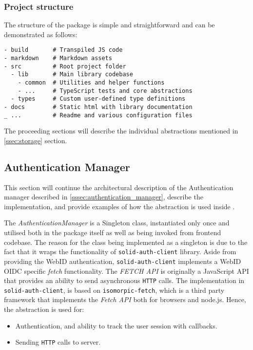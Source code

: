 \subsubsection{Project structure}

The structure of the \lpas{} package is simple and straightforward and can be demonstrated as follows:

\begin{lstlisting}
- build       # Transpiled JS code    
- markdown    # Markdown assets
- src         # Root project folder
  - lib       # Main library codebase
    - common  # Utilities and helper functions
   	- ...     # TypeScript tests and core abstractions
  - types     # Custom user-defined type definitions
- docs        # Static html with library documentation
_ ...         # Readme and various configuration files
\end{lstlisting}

The proceeding sections will describe the individual abstractions mentioned in \autoref{ssec:storage} section.

\subsection{Authentication Manager}
\label{sssec:authentication_manager_implementation}

This section will continue the architectural description of the Authentication manager described in \autoref{sssec:authentication_manager}, describe the implementation, and provide examples of how the abstraction is used inside \lpa{}.

The \textit{AuthenticationManager} is a Singleton class, instantiated only once and utilised both in the package itself as well as being invoked from \lpa{} frontend codebase. The reason for the class being implemented as a singleton is due to the fact that it wraps the functionality of \texttt{solid-auth-client} library. Aside from providing the WebID authentication,  \texttt{solid-auth-client} implements a WebID OIDC specific \textit{fetch} functionality. The \textit{FETCH API} is originally a JavaScript API that provides an ability to send asynchronous \texttt{HTTP} calls. The implementation in \texttt{solid-auth-client}, is based on \texttt{isomorpic-fetch}, which is a third party framework that implements the \textit{Fetch API} both for browsers and node.js. Hence, the abstraction is used for:
\begin{itemize}
    \item Authentication, and ability to track the user session with callbacks. 
    \item Sending \texttt{HTTP} calls to \solid{} server.
\end{itemize}


